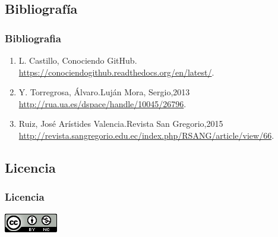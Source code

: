 \documentclass{beamer}
\begin{document}
\subsection{Bibliografía}
\begin{frame}
\frametitle{Bibliografia}
	\begin{enumerate}
		\item L. Castillo, Conociendo GitHub. \url{https://conociendogithub.readthedocs.org/en/latest/}.
		\item Y. Torregrosa, Álvaro.Luján Mora, Sergio,2013 \url{http://rua.ua.es/dspace/handle/10045/26796}.
		\item Ruiz, José Arístides Valencia.Revista San Gregorio,2015 \url{http://revista.sangregorio.edu.ec/index.php/RSANG/article/view/66}.
	\end{enumerate}
\end{frame}

\subsection{Licencia}
\begin{frame}
\frametitle{Licencia}
\begin{center}
\href{http://www.google.com}{\includegraphics[scale=.8]{cc}}
\end{center}
\end{frame}

\MuchasGraciasFrame
\end{document}
